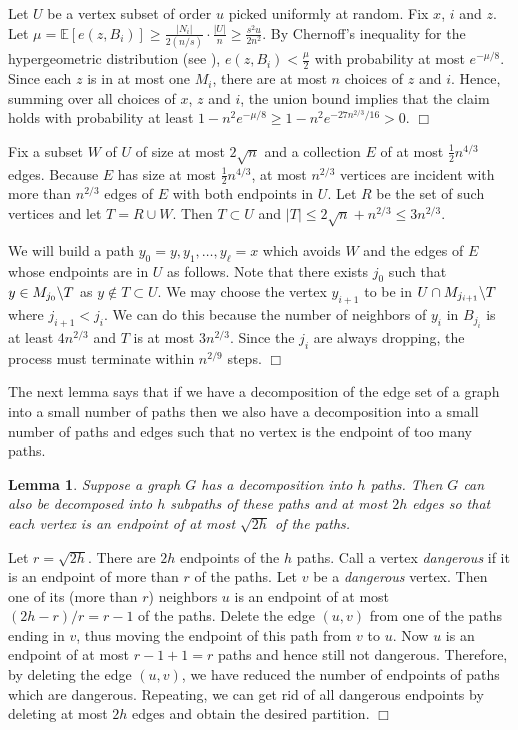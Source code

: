 \documentclass[11pt]{article}
\newtheorem{lemma}[theorem]{Lemma}
\newenvironment{proof}
      {\medskip\noindent{\bf Proof:}\hspace{1mm}}
      {\hfill$\Box$\medskip}
\begin{document}
\begin{proof}
\begin{proof}
Let $U$ be a vertex subset of order $u$ picked uniformly at random. Fix $x$, $i$ and $z$. Let $\mu = \mathbb{E} [e(z, B_i)] \geq \frac{|N_i|}{2 (n/s)} \cdot \frac{|U|}{n} \geq \frac{s^2 u}{2 n^2}$.
By Chernoff's inequality for the hypergeometric distribution (see \cite{AS, H63}), $e(z, B_i) < \frac{\mu}{2}$ with probability at most $e^{-\mu/8}$. Since each $z$ is in at most one $M_i$, there are at most  $n$ choices of $z$ and $i$. Hence, summing over all choices of $x$, $z$ and $i$, the union bound implies that the claim holds with probability at least $1 - n^2 e^{-\mu/8} \geq 1 - n^2 e^{- 27 n^{2/3}/16} > 0$.
\end{proof}

Fix a subset $W$ of $U$ of size at most $2 \sqrt{n}$ and a collection $E$ of at most $\frac{1}{2} n^{4/3}$ edges. Because $E$ has size at most $\frac{1}{2} n^{4/3}$, at most $n^{2/3}$ vertices are incident with more than $n^{2/3}$ edges of $E$ with both endpoints in $U$. Let $R$ be the set of such vertices and let $T = R \cup W$. Then $T \subset U$ and
$|T| \leq 2 \sqrt{n} + n^{2/3} \leq 3 n^{2/3}$.

We will build a path $y_0 = y, y_1, \dots, y_{\ell} = x$ which avoids $W$ and the edges of $E$ whose endpoints are in $U$ as follows. Note that there exists $j_0$ such that $y \in M_{j_0} \char 92 T$ as $y \not\in T \subset U$. We may choose the vertex $y_{i+1}$ to be in $U \cap M_{j_{i+1}}\char92 T$ where $j_{i+1} < j_i$. We can do this because the number of neighbors of $y_i$ in $B_{j_i}$ is at least $4 n^{2/3}$ and $T$ is at most $3 n^{2/3}$. Since the $j_i$ are always dropping, the process must terminate within $n^{2/9}$ steps.
\end{proof}

The next lemma says that if we have a decomposition of the edge set of a graph into a small number of paths then we also have a decomposition into a small number of paths and edges such that no vertex is the endpoint of too many paths.

\begin{lemma}\label{sparseends}
Suppose a graph $G$ has a decomposition into $h$ paths. Then $G$ can also be decomposed into $h$ subpaths of these paths and at most $2h$ edges so that each vertex is an endpoint of at most $\sqrt{2h}$ of the paths.
\end{lemma}
\begin{proof}
Let $r=\sqrt{2h}$. There are $2h$ endpoints of the $h$ paths. Call a vertex  {\it dangerous} if it is an endpoint of more than $r$ of the paths. Let $v$ be a {\it dangerous} vertex.
Then one of its (more than $r$) neighbors $u$ is an endpoint of at most $(2h-r)/r=r-1$ of the paths.  Delete the edge $(u,v)$ from one of the paths ending in $v$, thus moving the endpoint of this path from $v$ to $u$. Now $u$ is an endpoint of at most $r-1+1=r$ paths and hence still not dangerous. Therefore, by deleting the edge $(u,v)$, we have reduced the number of endpoints of paths which are dangerous.  Repeating, we can get rid of all dangerous endpoints by deleting at most $2h$ edges and obtain the desired partition.
\end{proof}
\end{document}
